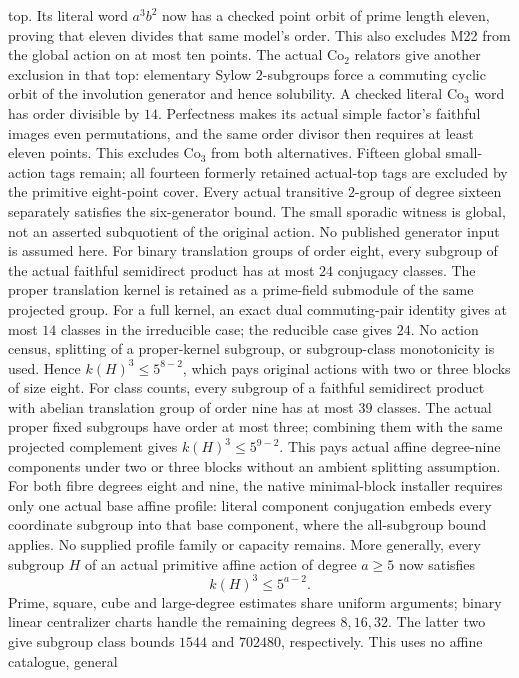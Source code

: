 top. Its literal word $a^3b^2$ now has a checked point orbit of prime
length eleven, proving that eleven divides that same model's order.
This also excludes M22 from the global action on at most ten points.
The actual Co$_2$ relators give another exclusion in that
top: elementary Sylow $2$-subgroups force a commuting cyclic orbit of
the involution generator and hence solubility. A checked literal Co$_3$
word has order divisible by $14$. Perfectness makes its actual simple
factor's faithful images even permutations, and the same order divisor
then requires at least eleven points. This excludes Co$_3$ from both
alternatives. Fifteen global small-action tags remain; all fourteen
formerly retained actual-top tags are excluded by the primitive
eight-point cover. Every actual transitive $2$-group of degree sixteen
separately satisfies the six-generator bound.
The small sporadic witness is global, not an asserted subquotient of
the original action. No published generator input is assumed here.
For binary translation groups of order eight, every subgroup of the
actual faithful semidirect product has at most $24$ conjugacy classes.
The proper translation kernel is retained as a prime-field submodule
of the same projected group. For a full kernel, an exact dual
commuting-pair identity gives at most $14$ classes in the irreducible
case; the reducible case gives $24$. No action census, splitting of a
proper-kernel subgroup, or subgroup-class monotonicity is used. Hence
$k(H)^3\leq5^{8-2}$, which pays original actions with two or three blocks
of size eight.
For class counts, every subgroup of a faithful semidirect product
with abelian translation group of order nine has at most $39$ classes.
The actual proper fixed subgroups have order at most three; combining
them with the same projected complement gives
$k(H)^3\leq5^{9-2}$. This pays actual affine degree-nine components
under two or three blocks without an ambient splitting assumption.
For both fibre degrees eight and nine, the native minimal-block
installer requires only one actual base affine profile: literal
component conjugation embeds every coordinate subgroup into that base
component, where the all-subgroup bound applies. No supplied profile
family or capacity remains.
More generally, every subgroup $H$ of an actual primitive affine action
of degree $a\geq5$ now satisfies
\[
  k(H)^3\leq5^{a-2}.
\]
Prime, square, cube and large-degree estimates share uniform arguments;
binary linear centralizer charts handle the remaining degrees
$8,16,32$. The latter two give subgroup class bounds $1544$ and
$702480$, respectively. This uses no affine catalogue, general
